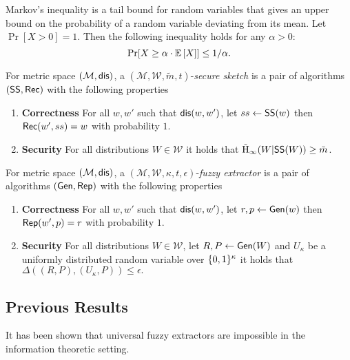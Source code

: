 \begin{definition}
    Markov's inequality is a tail bound for random variables that gives an upper bound on the probability of a random variable deviating from its mean. Let $\Pr[X>0] = 1$. Then the following inequality holds for any $\alpha > 0$: 
    \[ 
      \Pr\!\left[X \geq \alpha \cdot \operatorname*{\mathbb{E}}\left[X\right]\right] \leq 1/\alpha .
    \]
\end{definition}

\begin{definition}
For metric space $(\mathcal{M}, \mathsf{dis})$, a $(\mathcal{M}, \mathcal{W}, \tilde{m}, t)$-\emph{secure sketch} is a pair of algorithms $({\mathsf{SS}}, {\mathsf{Rec}})$ with the following properties 
\begin{enumerate} 
\itemsep0em
\item \textbf{Correctness} For all $w, w'$ such that $\mathsf{dis}(w, w')$, let $ss \leftarrow {\ensuremath{\mathsf{SS}}}(w)$ then ${\mathsf{Rec}}(w', ss) = w$ with probability $1$. 
\item \textbf{Security} For all distributions $W \in \mathcal{W}$ it holds that $\tilde{\mathrm{H}}_\infty(W | {\mathsf{SS}}(W)) \ge \tilde{m}$.
\end{enumerate}
\end{definition}

\begin{definition}
For metric space $(\mathcal{M}, \mathsf{dis})$, a $(\mathcal{M}, \mathcal{W}, \kappa, t, \epsilon)$-\emph{fuzzy extractor} is a pair of algorithms $({\mathsf{Gen}}, {\mathsf{Rep}})$ with the following properties 
\begin{enumerate} 
\itemsep0em
\item \textbf{Correctness} For all $w, w'$ such that $\mathsf{dis}(w, w')$, let $r, p \leftarrow {\ensuremath{\mathsf{Gen}}}(w)$ then ${\mathsf{Rep}}(w', p) = r$ with probability $1$. 
\item \textbf{Security} For all distributions $W \in \mathcal{W}$, let $R, P \leftarrow {\ensuremath{\mathsf{Gen}}}(W)$ and $U_\kappa$ be a uniformly distributed random variable over $\{0, 1\}^\kappa$ it holds that $\Delta((R, P), (U_\kappa, P))\le \epsilon.$
\end{enumerate}
\end{definition}

\subsection{Previous Results}
It has been shown that universal fuzzy extractors are impossible in the information theoretic setting. 

